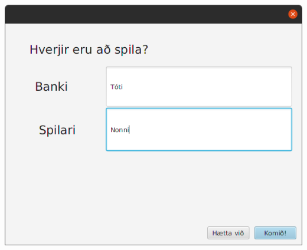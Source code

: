 \documentclass{article}
\begin{document}
\begin{center}
    \includegraphics[scale=0.27]{Dialog3.png}
\end{center}
\end{document}
